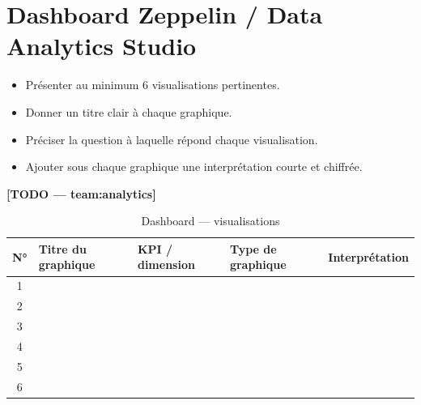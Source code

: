 \section{Dashboard Zeppelin / Data Analytics Studio}
\begin{itemize}
  \item Présenter au minimum 6 visualisations pertinentes.
  \item Donner un titre clair à chaque graphique.
  \item Préciser la question à laquelle répond chaque visualisation.
  \item Ajouter sous chaque graphique une interprétation courte et chiffrée.
\end{itemize}
\textbf{[TODO — team:analytics]}

\begin{table}[H]
\centering
\caption{Dashboard — visualisations}
\begin{tabular}{cp{3cm}p{2.5cm}p{2.5cm}p{3.5cm}}
\toprule
N° & Titre du graphique & KPI / dimension & Type de graphique & Interprétation \\
\midrule
1 & & & & \\
2 & & & & \\
3 & & & & \\
4 & & & & \\
5 & & & & \\
6 & & & & \\
\bottomrule
\end{tabular}
\end{table}
